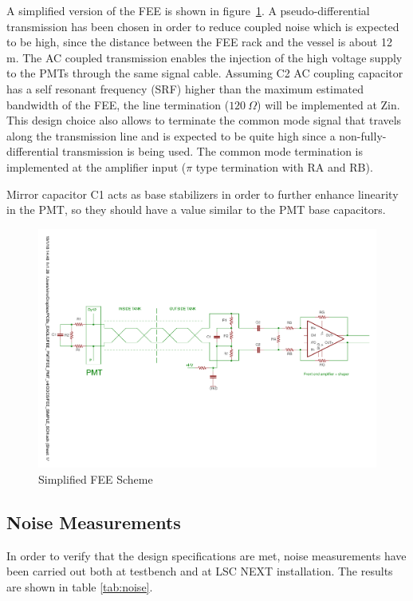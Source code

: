 \documentclass[a4paper, 10pt, oneside, twocolumn, 3p]{elsarticle}
\begin{document}
\par   A simplified version of the FEE is shown in figure~\ref{fig:FEE_scheme}. A pseudo-differential transmission has been chosen in order to reduce coupled noise which is expected to be high, since the distance between the FEE rack and the vessel is about 12 m. The AC coupled transmission enables the injection of the high voltage supply to the PMTs through the same signal cable. Assuming C2 AC coupling capacitor has a self resonant frequency (SRF) higher than the maximum estimated bandwidth of the FEE,  the line termination ($120~\Omega$) will be implemented at Zin. This design choice also allows to terminate the common mode signal that travels along the transmission line and is expected to be quite high since a non-fully-differential transmission is being used. The common mode termination is implemented at the amplifier input ($\pi$ type termination with RA and RB).

\par Mirror capacitor C1 acts as base stabilizers in order to further enhance linearity in the PMT, so they should have a value similar to the PMT base capacitors.


\begin{figure}[ht]
	\begin{center}
		\includegraphics[width=\textwidth]{./figures/FEE_simple_scheme.pdf}
		\caption{Simplified FEE Scheme}
		\label{fig:FEE_scheme}
	\end{center}
\end{figure}


\subsection{Noise Measurements}
In order to verify that the design specifications are met, noise measurements have been carried out both at testbench and at LSC NEXT installation. The results are shown in table \ref{tab:noise}. 
\end{document}
